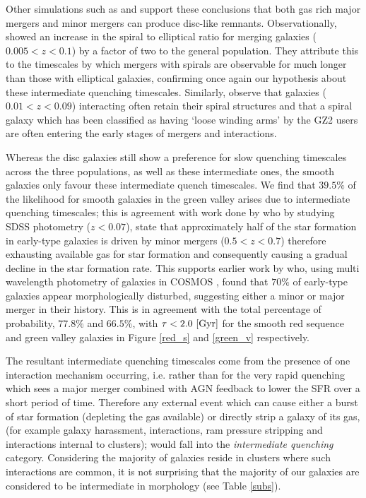\documentclass[useAMS,usenatbib]{mn2e}
\def\changed    {\color{titlecol} }
\begin{document}
Other simulations such as \citet{Rob06} and \citet{Barnes02} support these conclusions that both gas rich major mergers and minor mergers can produce disc-like remnants. Observationally, \citet{Darg10a} showed an increase in the spiral to elliptical ratio for merging galaxies ($0.005 < z < 0.1$) by a factor of two to the general population. They attribute this to the timescales by which mergers with spirals are observable for much longer than those with elliptical galaxies, confirming once again our hypothesis about these intermediate quenching timescales. Similarly, \citet{Casteels13} observe that galaxies ($0.01 < z < 0.09$) interacting often retain their spiral structures and that a spiral galaxy which has been classified as having `loose winding arms' by the GZ2 users are often entering the early stages of mergers and interactions.

Whereas the disc galaxies still show a preference for slow quenching timescales across the three populations, as well as these intermediate ones, the smooth galaxies only favour these intermediate quench timescales. We find that $39.5\%$ of the likelihood for smooth galaxies in the green valley arises due to intermediate quenching timescales; this is agreement with work done by \citet{Kav14} who by studying SDSS photometry ($z<0.07$), state that approximately half of the star formation in early-type galaxies is driven by minor mergers ($0.5 < z < 0.7$) therefore exhausting available gas for star formation and consequently causing a gradual decline in the star formation rate. This supports earlier work by \cite{Kav11} who, using multi wavelength photometry of galaxies in COSMOS \citep{Scoville07}, found that $70\%$ of early-type galaxies  appear morphologically disturbed, suggesting either a minor or major merger in their history. {\changed This is in agreement with the total percentage of probability, $77.8\%$ and $66.5\%$, with $\tau < 2.0 ~\rm[Gyr]$ for the smooth red sequence and green valley galaxies in Figure \ref{red_s} and \ref{green_v} respectively.}

The resultant intermediate quenching timescales come from the presence of one interaction mechanism occurring, i.e. rather than for the very rapid quenching which sees a major merger combined with AGN feedback to lower the SFR over a short period of time. Therefore any external event which can cause either a burst of star formation (depleting the gas available) or directly strip a galaxy of its gas, (for example galaxy harassment, interactions, ram pressure stripping and interactions internal to clusters); would fall into the \emph{intermediate quenching} category. Considering the majority of galaxies reside in clusters where such interactions are common, it is not surprising that the majority of our galaxies are considered to be intermediate in morphology (see Table \ref{subs}).
\end{document}
